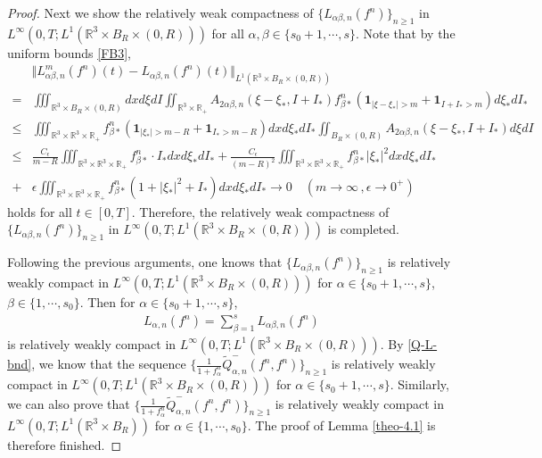 \documentclass[reqno,11pt]{amsart}
\numberwithin{equation}{section}
\def\R{\mathbb{R}}
\begin{document}
\begin{proof}
Next we show the relatively weak compactness of $\{ L_{ \alpha \beta ,n} (f^n) \}_{n \geq 1} $ in $L^\infty (0,T; L^1(\R^3 \times B_R\times (0,R) ))$ for all $\alpha, \beta \in \{ s_0 + 1, \cdots, s \}$. Note that by the uniform bounds \eqref{FB3},
	\begin{equation*}
		\begin{aligned}
			&\Vert L^m_{ \alpha \beta ,n} (f^n) (t)-L_{ \alpha \beta ,n} (f^n) (t) \Vert_{L^1(\R^3 \times B_R \times (0,R))} \\
			= & \iiint_{\R^3 \times B_R \times (0,R)}dxd\xi dI \iint_{ \R^3 \times \R_+} A_{2\alpha \beta,n}(\xi-\xi_*,I+I_*) f^n_{\beta *}( \mathbf{1}_{|\xi-\xi_*|> m} + \mathbf{1}_{I+I_*>m})d\xi_* dI_* \\
			\leq & \iiint_{ \R^3 \times \R^3 \times \R_+} f^n_{\beta *}( \mathbf{1}_{|\xi_*|> m-R}+ \mathbf{1}_{I_*>m-R}) dxd\xi_* dI_* \iint_{B_R \times (0,R)} A_{2\alpha \beta,n}(\xi-\xi_*,I+I_*) d\xi dI \\
			\leq &\tfrac{C_\epsilon}{m-R} \iiint_{ \R^3 \times \R^3 \times \R_+} f^n_{\beta *} \cdot I_* dxd\xi_* dI_* + \tfrac{C_\epsilon}{(m-R)^2} \iiint_{ \R^3 \times \R^3 \times \R_+} f^n_{\beta *}|\xi_*|^2 dxd\xi_* dI_* \\
			+ &\epsilon \iiint_{ \R^3 \times \R^3 \times \R_+} f^n_{\beta *} (1+|\xi_*|^2 +I_*) dxd\xi_* dI_* \rightarrow 0 \quad (m \rightarrow \infty \,, \epsilon \rightarrow 0^+)
		\end{aligned}
	\end{equation*}
holds for all $t \in [0, T]$. Therefore, the relatively weak compactness of $\{ L_{ \alpha \beta ,n} (f^n) \}_{n \geq 1} $ in $L^\infty (0,T; L^1(\R^3 \times B_R\times (0,R) ))$ is completed. 

Following the previous arguments, one knows that $\{ L_{ \alpha \beta ,n} (f^n) \}_{n \geq 1} $ is relatively weakly compact in $L^\infty (0,T; L^1(\R^3 \times B_R\times (0,R) ))$ for $\alpha \in \{ s_0 + 1, \cdots, s \}$, $ \beta \in \{ 1, \cdots, s_0 \} $. Then for $\alpha \in \{ s_0 + 1, \cdots, s \}$, 
\begin{equation*}
  \begin{aligned}
    L_{\alpha, n} (f^n) = \sum_{\beta = 1}^{s} L_{ \alpha \beta, n } (f^n)
  \end{aligned}
\end{equation*}
is relatively weakly compact in $L^\infty (0,T; L^1(\R^3 \times B_R\times (0,R) ))$. By \eqref{Q-L-bnd}, we know that the sequence $ \{ \frac{1}{1 + f^n_\alpha} \tilde{Q}^-_{\alpha, n} (f^n, f^n) \}_{n \geq 1} $ is relatively weakly compact in $L^\infty (0,T; L^1(\R^3 \times B_R\times (0,R) ))$ for $\alpha \in \{ s_0 + 1, \cdots, s \}$. Similarly, we can also prove that $ \{ \frac{1}{1 + f^n_\alpha} \tilde{Q}_{\alpha, n}^- (f^n, f^n) \}_{n \geq 1} $ is relatively weakly compact in $L^\infty (0,T; L^1(\R^3 \times B_R ))$ for $\alpha \in \{ 1, \cdots, s_0 \}$. The proof of Lemma \ref{theo-4.1} is therefore finished.
\end{proof}
\end{document}
